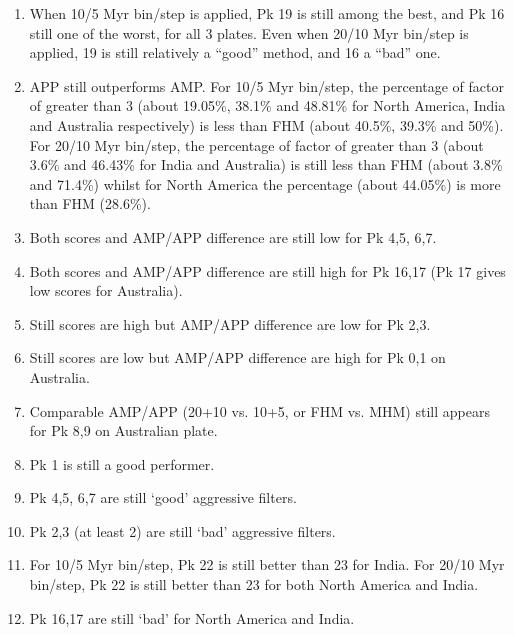\begin{enumerate}
  \item When 10/5 Myr bin/step is applied, Pk 19 is still among the best,
	and Pk 16 still one of the worst, for all 3 plates. Even when 20/10 Myr
	bin/step is applied, 19 is still relatively a ``good'' method, and 16 a
	``bad'' one.
  \item APP still outperforms AMP\@. For 10/5 Myr bin/step, the percentage of
	factor of greater than 3 (about 19.05\%, 38.1\% and 48.81\% for North
	America, India and Australia respectively) is less than FHM (about 40.5\%,
	39.3\% and 50\%). For 20/10 Myr bin/step, the percentage of factor of
	greater than 3 (about 3.6\% and 46.43\% for India and Australia) is still
	less than FHM (about 3.8\% and 71.4\%) whilst for North America the
	percentage (about 44.05\%) is more than FHM (28.6\%).
  \item Both scores and AMP/APP difference are still low for Pk 4,5, 6,7.
  \item Both scores and AMP/APP difference are still high for Pk 16,17
	(Pk 17 gives low scores for Australia).
  \item Still scores are high but AMP/APP difference are low for Pk 2,3.
  \item Still scores are low but AMP/APP difference are high for Pk 0,1 on
	Australia.
  \item Comparable AMP/APP (20+10 vs. 10+5, or FHM vs. MHM) still appears for
	Pk 8,9 on Australian plate.
  \item Pk 1 is still a good performer.
  \item Pk 4,5, 6,7 are still `good' aggressive filters.
  \item Pk 2,3 (at least 2) are still `bad' aggressive filters.
  \item For 10/5 Myr bin/step, Pk 22 is still better than 23 for India. For
	20/10 Myr bin/step, Pk 22 is still better than 23 for both North
	America and India.
  \item Pk 16,17 are still `bad' for North America and India.
\end{enumerate}

